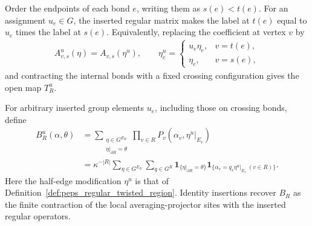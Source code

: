 \begin{definition}%
    \label{def:peps_regular_twisted_region}
    \leanok
    Order the endpoints of each bond $e$, writing them as $s(e)<t(e)$.
    For an assignment $u_e\in G$, the inserted regular matrix makes
    the label at $t(e)$ equal to $u_e$ times the label at $s(e)$.
    Equivalently, replacing the coefficient at vertex $v$ by
    \begin{align}
        A^u_{v,s}(\eta)=A_{v,s}(\eta^u),\qquad
        \eta^u_e=
        \begin{cases}u_e\eta_e, & v=t(e), \\ \eta_e,&v=s(e),
        \end{cases}
    \end{align}
    and contracting the internal bonds with a fixed crossing configuration
    gives the open map $T_R^u$.
\end{definition}

\begin{definition}%
    \label{def:peps_regular_projector_twisted_region}
    \leanok
    For arbitrary inserted group elements $u_e$, including those on
    crossing bonds, define
    \begin{align}
        B_R^u(\alpha,\theta)
         & =\sum_{\substack{\eta\in G^{E_R}                    \\
                \eta|_{\partial R}=\theta}}
        \prod_{v\in R}P_v(\alpha_v,\eta^u|_{E_v})              \\
         & =\kappa^{-|R|}\sum_{\eta\in G^{E_R}}\sum_{q\in G^R}
        \mathbf1_{\{\eta|_{\partial R}=\theta\}}
        \mathbf1_{\{\alpha_v=q_v\eta^u|_{E_v}\ (v\in R)\}}.
        \label{eq:peps_twisted_projector_region}
    \end{align}
    Here the half-edge modification $\eta^u$ is that of
    Definition~\ref{def:peps_regular_twisted_region}. Identity insertions
    recover $B_R$ as the finite contraction of the local
    averaging-projector sites with the inserted regular operators.
\end{definition}


